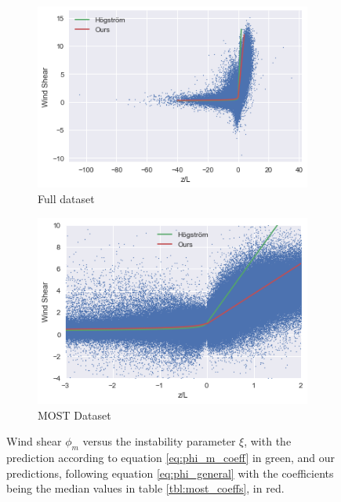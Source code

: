 \documentclass[a4paper,11pt]{kth-mag}
\begin{document}
\begin{figure}
    \centering
    \begin{subfigure}[t]{0.49\textwidth}
        \centering
        \includegraphics[width=\textwidth]{images/most_full}
        \caption{Full dataset}
        \label{fig:most_full}
    \end{subfigure}
    \hfill
    \begin{subfigure}[t]{0.49\textwidth}
        \centering
        \includegraphics[width=\textwidth]{images/most_zoom}
        \caption{MOST Dataset}
        \label{fig:most_zoom}
    \end{subfigure}
    \caption{Wind shear $\phi_m$ versus the instability parameter $\xi$, with the prediction according to equation \ref{eq:phi_m_coeff} in green, and our predictions, following equation \ref{eq:phi_general} with the coefficients being the median values in table \ref{tbl:most_coeffs}, in red.}
	\label{fig:most_scatter}
\end{figure}
\end{document}
